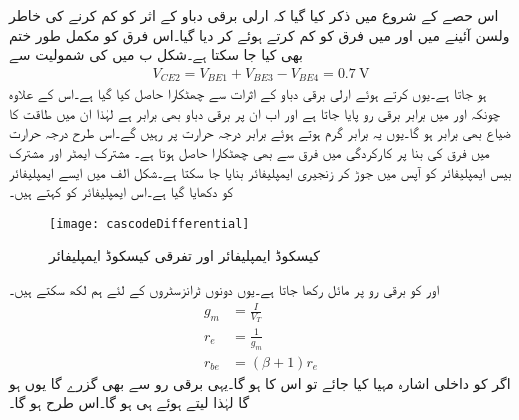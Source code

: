 اس حصے کے شروع میں ذکر کیا گیا کہ ارلی برقی دباو کے اثر کو کم کرنے کی خاطر ولسن آئینے میں  اور  میں فرق کو کم کرتے ہوئے  کر دیا گیا۔اس فرق کو مکمل طور ختم بھی کیا جا سکتا ہے۔شکل  ب میں  کی شمولیت سے 
\begin{align*}
V_{CE2}=V_{BE1}+V_{BE3}-V_{BE4}=\SI{0.7}{\volt}
\end{align*}
ہو جاتا ہے۔یوں  کرتے  ہوئے ارلی برقی دباو کے اثرات سے چھٹکارا حاصل کیا گیا ہے۔اس کے علاوہ چونکہ  اور  میں برابر برقی رو پایا جاتا ہے اور اب ان پر برقی دباو بھی برابر ہے لہٰذا ان میں طاقت کا ضیاع بھی برابر ہو گا۔یوں یہ برابر گرم ہوتے ہوئے برابر درجہ حرارت پر رہیں گے۔اس طرح درجہ حرارت میں فرق کی بنا پر کارکردگی میں فرق سے بھی چھٹکارا حاصل ہوتا ہے۔ 
مشترک ایمٹر اور مشترک بیس ایمپلیفائر کو آپس میں جوڑ کر  زنجیری ایمپلیفائر بنایا جا سکتا ہے۔شکل  الف میں ایسے ایمپلیفائر کو دکھایا گیا ہے۔اس ایمپلیفائر کو  کہتے ہیں۔
\begin{figure}
\centering
\texttt{[image: cascodeDifferential]}
\caption{کیسکوڈ ایمپلیفائر اور تفرقی کیسکوڈ ایمپلیفائر}
\label{شکل_تفرقی_کیسکوڈ}
\end{figure}

 اور  کو  برقی رو پر مائل رکھا جاتا ہے۔یوں دونوں ٹرانزسٹروں کے لئے ہم لکھ سکتے ہیں۔
\begin{align*}
g_m&=\frac{I}{V_T}\\
r_e& =\frac{1}{g_m}\\
r_{be}&=\left(\beta+1 \right) r_e
\end{align*}
اگر  کو  داخلی اشارہ مہیا کیا جائے تو اس کا  ہو گا۔یہی برقی رو  سے بھی گزرے گا یوں  ہو گا لہٰذا  لیتے ہوئے ہی ہو گا۔اس طرح  ہو گا۔

